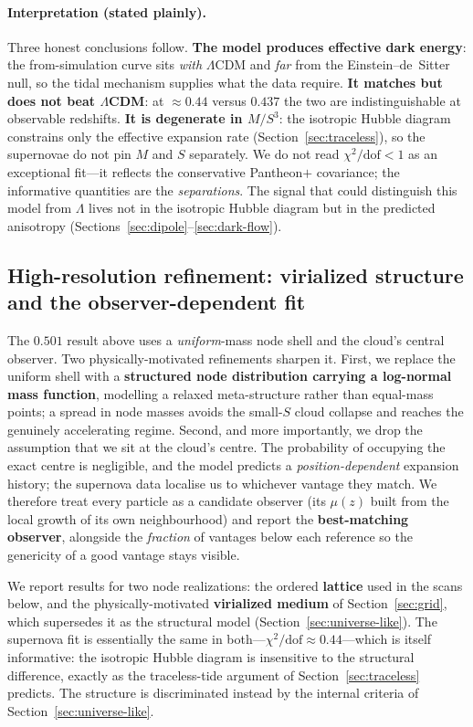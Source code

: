 \documentclass{article}
\begin{document}
\paragraph{Interpretation (stated plainly).}
Three honest conclusions follow. \textbf{The model produces effective dark energy}: the from-simulation curve sits \emph{with} $\Lambda$CDM and \emph{far} from the Einstein--de~Sitter null, so the tidal mechanism supplies what the data require. \textbf{It matches but does not beat $\Lambda$CDM}: at $\approx 0.44$ versus $0.437$ the two are indistinguishable at observable redshifts. \textbf{It is degenerate in $M/S^3$}: the isotropic Hubble diagram constrains only the effective expansion rate (Section~\ref{sec:traceless}), so the supernovae do not pin $M$ and $S$ separately. We do not read $\chi^2/\mathrm{dof} < 1$ as an exceptional fit---it reflects the conservative Pantheon$+$ covariance; the informative quantities are the \emph{separations}. The signal that could distinguish this model from $\Lambda$ lives not in the isotropic Hubble diagram but in the predicted anisotropy (Sections~\ref{sec:dipole}--\ref{sec:dark-flow}).

\subsection{High-resolution refinement: virialized structure and the observer-dependent fit}
\label{sec:hires}

The $0.501$ result above uses a \emph{uniform}-mass node shell and the cloud's central observer. Two physically-motivated refinements sharpen it. First, we replace the uniform shell with a \textbf{structured node distribution carrying a log-normal mass function}, modelling a relaxed meta-structure rather than equal-mass points; a spread in node masses avoids the small-$S$ cloud collapse and reaches the genuinely accelerating regime. Second, and more importantly, we drop the assumption that we sit at the cloud's centre. The probability of occupying the exact centre is negligible, and the model predicts a \emph{position-dependent} expansion history; the supernova data localise us to whichever vantage they match. We therefore treat every particle as a candidate observer (its $\mu(z)$ built from the local growth of its own neighbourhood) and report the \textbf{best-matching observer}, alongside the \emph{fraction} of vantages below each reference so the genericity of a good vantage stays visible.

We report results for two node realizations: the ordered \textbf{lattice} used in the scans below, and the physically-motivated \textbf{virialized medium} of Section~\ref{sec:grid}, which supersedes it as the structural model (Section~\ref{sec:universe-like}). The supernova fit is essentially the same in both---$\chi^2/\mathrm{dof}\approx0.44$---which is itself informative: the isotropic Hubble diagram is insensitive to the structural difference, exactly as the traceless-tide argument of Section~\ref{sec:traceless} predicts. The structure is discriminated instead by the internal criteria of Section~\ref{sec:universe-like}.
\end{document}
